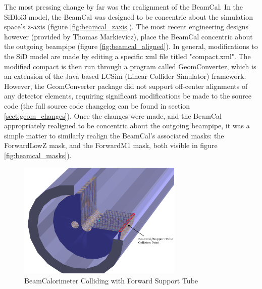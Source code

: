 \documentclass{report}
\begin{document}
            The most pressing change by far was the realignment of the BeamCal. In the SiDloi3 model, the BeamCal was designed to be concentric about the simulation space's z-axis (figure \ref{fig:beamcal_zaxis}). The most recent engineering designs however (provided by Thomas Markievicz), place the BeamCal concentric about the outgoing beampipe (figure \ref{fig:beamcal_aligned}). In general, modifications to the SiD model are made by editing a specific xml file titled "compact.xml". The modified compact is then run through a program called GeomConverter, which is an extension of the Java based LCSim (Linear Collider Simulator) framework. However, the GeomConverter package did not support off-center alignments of any detector elements, requiring significant modifications be made to the source code (the full source code changelog can be found in section \ref{sect:geom_changes}). Once the changes were made, and the BeamCal appropriately realigned to be concentric about the outgoing beampipe, it was a simple matter to similarly realign the BeamCal's associated masks: the ForwardLowZ mask, and the ForwardM1 mask, both visible in figure \ref{fig:beamcal_masks}). 

            \begin{figure}[h] 
                \includegraphics[width=0.7\textwidth]{beamcal_collide}
                \centering
                \caption{BeamCalorimeter Colliding with Forward Support Tube}
                \label{fig:beamcal_collide}
            \end{figure}
\end{document}
